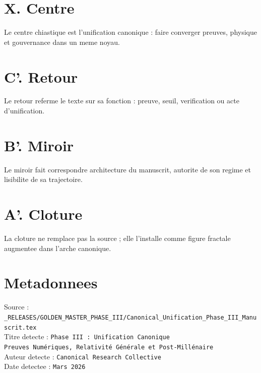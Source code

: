 \documentclass[11pt,a4paper]{article}
\begin{document}
\section*{X. Centre}
Le centre chiastique est l'unification canonique : faire converger preuves, physique et gouvernance dans un meme noyau.

\section*{C'. Retour}
Le retour referme le texte sur sa fonction : preuve, seuil, verification ou acte d'unification.

\section*{B'. Miroir}
Le miroir fait correspondre architecture du manuscrit, autorite de son regime et lisibilite de sa trajectoire.

\section*{A'. Cloture}
La cloture ne remplace pas la source ; elle l'installe comme figure fractale augmentee dans l'arche canonique.

\section*{Metadonnees}
Source : \verb|_RELEASES/GOLDEN_MASTER_PHASE_III/Canonical_Unification_Phase_III_Manuscrit.tex|\\
Titre detecte : \texttt{Phase III : Unification Canonique \\ Preuves Numériques, Relativité Générale et Post-Millénaire}\\
Auteur detecte : \texttt{Canonical Research Collective}\\
Date detectee : \texttt{Mars 2026}
\end{document}

